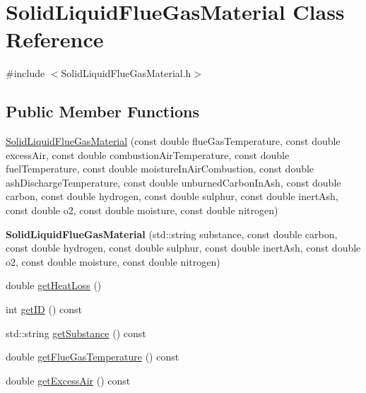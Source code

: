\hypertarget{class_solid_liquid_flue_gas_material}{}\section{Solid\+Liquid\+Flue\+Gas\+Material Class Reference}
\label{class_solid_liquid_flue_gas_material}


{\ttfamily \#include $<$Solid\+Liquid\+Flue\+Gas\+Material.\+h$>$}

\subsection*{Public Member Functions}
\begin{DoxyCompactItemize}
\item 
\hyperlink{class_solid_liquid_flue_gas_material_a91e7c5e670b3db4fedcbc494448644d5}{Solid\+Liquid\+Flue\+Gas\+Material} (const double flue\+Gas\+Temperature, const double excess\+Air, const double combustion\+Air\+Temperature, const double fuel\+Temperature, const double moisture\+In\+Air\+Combustion, const double ash\+Discharge\+Temperature, const double unburned\+Carbon\+In\+Ash, const double carbon, const double hydrogen, const double sulphur, const double inert\+Ash, const double o2, const double moisture, const double nitrogen)
\item 
\mbox{\label{class_solid_liquid_flue_gas_material_a20ad2bd800e215fdaa1c534355cc803b}} 
{\bfseries Solid\+Liquid\+Flue\+Gas\+Material} (std\+::string substance, const double carbon, const double hydrogen, const double sulphur, const double inert\+Ash, const double o2, const double moisture, const double nitrogen)
\item 
double \hyperlink{class_solid_liquid_flue_gas_material_af7d36673e49f9b5eb631fc04227883d6}{get\+Heat\+Loss} ()
\item 
int \hyperlink{class_solid_liquid_flue_gas_material_afb124b546137da7ba99e31616198e0c8}{get\+ID} () const
\item 
std\+::string \hyperlink{class_solid_liquid_flue_gas_material_a6e07a23fb05c15c7e5dba39334988de8}{get\+Substance} () const
\item 
double \hyperlink{class_solid_liquid_flue_gas_material_aba4604158b3c624496d7de4b5fb511e2}{get\+Flue\+Gas\+Temperature} () const
\item 
double \hyperlink{class_solid_liquid_flue_gas_material_a49e7bb4ebc45897c81b6f38610ceaf02}{get\+Excess\+Air} () const

\end{DoxyCompactItemize}
